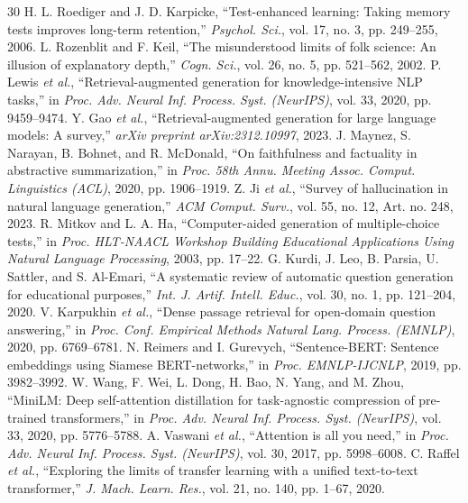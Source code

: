 \documentclass[conference]{IEEEtran}
\begin{document}
\begin{thebibliography}{30}
 H. L. Roediger and J. D. Karpicke, ``Test-enhanced learning: Taking memory tests improves long-term retention,'' \emph{Psychol. Sci.}, vol. 17, no. 3, pp. 249--255, 2006.
 L. Rozenblit and F. Keil, ``The misunderstood limits of folk science: An illusion of explanatory depth,'' \emph{Cogn. Sci.}, vol. 26, no. 5, pp. 521--562, 2002.
 P. Lewis \emph{et al.}, ``Retrieval-augmented generation for knowledge-intensive NLP tasks,'' in \emph{Proc. Adv. Neural Inf. Process. Syst. (NeurIPS)}, vol. 33, 2020, pp. 9459--9474.
 Y. Gao \emph{et al.}, ``Retrieval-augmented generation for large language models: A survey,'' \emph{arXiv preprint arXiv:2312.10997}, 2023.
 J. Maynez, S. Narayan, B. Bohnet, and R. McDonald, ``On faithfulness and factuality in abstractive summarization,'' in \emph{Proc. 58th Annu. Meeting Assoc. Comput. Linguistics (ACL)}, 2020, pp. 1906--1919.
 Z. Ji \emph{et al.}, ``Survey of hallucination in natural language generation,'' \emph{ACM Comput. Surv.}, vol. 55, no. 12, Art. no. 248, 2023.
 R. Mitkov and L. A. Ha, ``Computer-aided generation of multiple-choice tests,'' in \emph{Proc. HLT-NAACL Workshop Building Educational Applications Using Natural Language Processing}, 2003, pp. 17--22.
 G. Kurdi, J. Leo, B. Parsia, U. Sattler, and S. Al-Emari, ``A systematic review of automatic question generation for educational purposes,'' \emph{Int. J. Artif. Intell. Educ.}, vol. 30, no. 1, pp. 121--204, 2020.
 V. Karpukhin \emph{et al.}, ``Dense passage retrieval for open-domain question answering,'' in \emph{Proc. Conf. Empirical Methods Natural Lang. Process. (EMNLP)}, 2020, pp. 6769--6781.
 N. Reimers and I. Gurevych, ``Sentence-BERT: Sentence embeddings using Siamese BERT-networks,'' in \emph{Proc. EMNLP-IJCNLP}, 2019, pp. 3982--3992.
 W. Wang, F. Wei, L. Dong, H. Bao, N. Yang, and M. Zhou, ``MiniLM: Deep self-attention distillation for task-agnostic compression of pre-trained transformers,'' in \emph{Proc. Adv. Neural Inf. Process. Syst. (NeurIPS)}, vol. 33, 2020, pp. 5776--5788.
 A. Vaswani \emph{et al.}, ``Attention is all you need,'' in \emph{Proc. Adv. Neural Inf. Process. Syst. (NeurIPS)}, vol. 30, 2017, pp. 5998--6008.
 C. Raffel \emph{et al.}, ``Exploring the limits of transfer learning with a unified text-to-text transformer,'' \emph{J. Mach. Learn. Res.}, vol. 21, no. 140, pp. 1--67, 2020.

\end{thebibliography}
\end{document}
